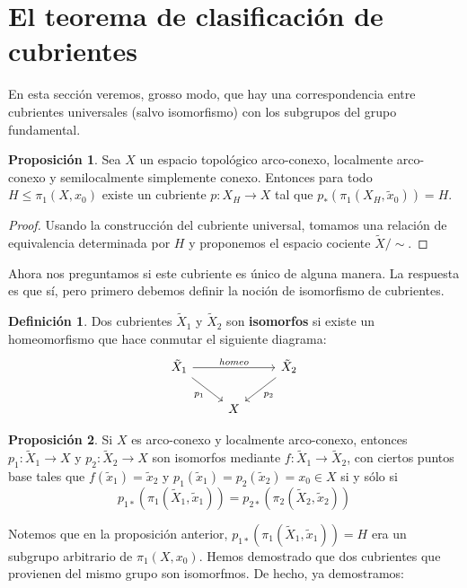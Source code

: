 \documentclass[spanish]{book}
\theoremstyle{definition}
\newtheorem*{defn}{Definición}
\newtheorem*{prop}{Proposición}
\begin{document}
\section{El teorema de clasificación de cubrientes}
En esta sección veremos, grosso modo, que hay una correspondencia entre cubrientes universales (salvo isomorfismo) con los subgrupos del grupo fundamental.

\begin{prop}
	Sea $X$ un espacio topológico arco-conexo, localmente arco-conexo y semilocalmente simplemente conexo. Entonces para todo $H\leq\pi_1(X,x_0)$ existe un cubriente $p:X_H\to X$ tal que $p_{*}\left(\pi_1(X_H,\tilde{x}_0)\right)=H$.
\end{prop}
\begin{proof}
	Usando la construcción del cubriente universal, tomamos una relación de equivalencia determinada por $H$ y proponemos el espacio cociente $\tilde{X}/\sim{}$.
\end{proof}
Ahora nos preguntamos si este cubriente es único de alguna manera. La respuesta es que sí, pero primero debemos definir la noción de isomorfismo de cubrientes.
\begin{defn}
	Dos cubrientes $\tilde{X}_1$ y $\tilde{X}_2$ son \textbf{isomorfos} si existe un homeomorfismo que hace conmutar el siguiente diagrama:
	\[\begin{tikzcd}
		\tilde{X}_1\arrow[dr,swap,"p_1"]\arrow[rr,"homeo"]&&\tilde{X}_2\arrow[dl,"p_2"]\\
		&X
	\end{tikzcd}\]
\end{defn}
\begin{prop}
	Si $X$ es arco-conexo y localmente arco-conexo, entonces $p_1:\tilde{X}_1\to X$ y $p_2:\tilde{X}_2\to X$ son isomorfos mediante $f:\tilde{X}_1\to\tilde{X}_2$, con ciertos puntos base tales que $f(\tilde{x}_1)=\tilde{x}_2$ y $p_1(\tilde{x}_1)=p_2(\tilde{x}_2)=x_0\in X$ si y sólo si
	\[p_{1*}\left(\pi_1(\tilde{X}_1,\tilde{x}_1)\right)=p_{2*}\left(\pi_2(\tilde{X}_2,\tilde{x}_2)\right)\]
\end{prop}
Notemos que en la proposición anterior, $p_{1*}\left(\pi_1(\tilde{X}_1,\tilde{x}_1)\right)=H$ era un subgrupo arbitrario de $\pi_1(X,x_0)$. Hemos demostrado que dos cubrientes que provienen del mismo grupo son isomorfmos. De hecho, ya demostramos:
\end{document}
